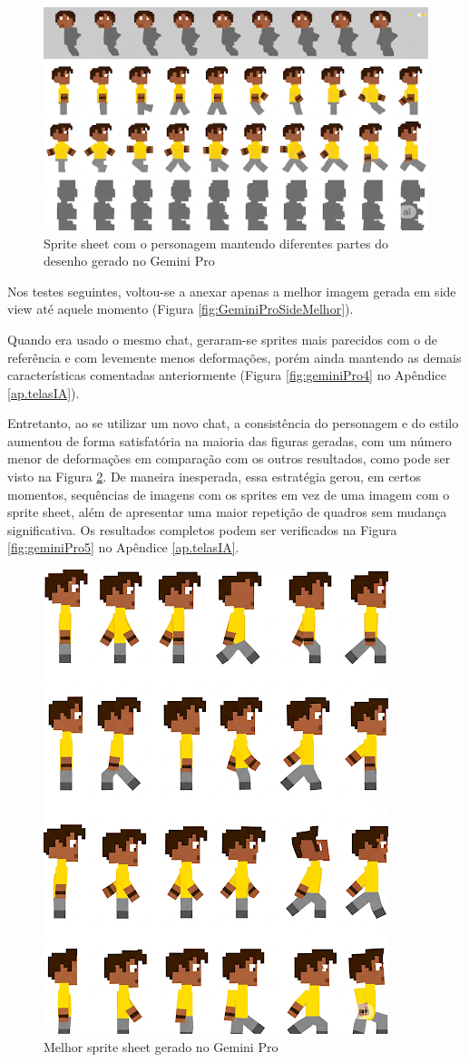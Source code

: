 \begin{figure}[htbp]
    \centering
    \caption{\small Sprite sheet com o personagem mantendo diferentes partes do desenho gerado no Gemini Pro}
    \label{fig:GeminiProSpriteSheetDesconstruido}
    \includegraphics[width=0.6\linewidth]{figs/geminiPro/chat9/1res5.PNG}
\end{figure}

Nos testes seguintes, voltou-se a anexar apenas a melhor imagem gerada em side view até aquele momento (Figura \ref{fig:GeminiProSideMelhor}). 

Quando era usado o mesmo chat, geraram-se sprites mais parecidos com o de referência e com levemente menos deformações, porém ainda mantendo as demais características comentadas anteriormente (Figura \ref{fig:geminiPro4} no Apêndice \ref{ap.telasIA}). 

Entretanto, ao se utilizar um novo chat, a consistência do personagem e do estilo aumentou de forma satisfatória na maioria das figuras geradas, com um número menor de deformações em comparação com os outros resultados, como pode ser visto na Figura \ref{fig:GeminiProSpriteSheetMelhor}. De maneira inesperada, essa estratégia gerou, em certos momentos, sequências de imagens com os sprites em vez de uma imagem com o sprite sheet, além de apresentar uma maior repetição de quadros sem mudança significativa.  Os resultados completos podem ser verificados na Figura \ref{fig:geminiPro5} no Apêndice \ref{ap.telasIA}.

\begin{figure}[htbp]
    \centering
    \caption{\small Melhor sprite sheet gerado no Gemini Pro}
    \label{fig:GeminiProSpriteSheetMelhor}
    \includegraphics[width=0.5\linewidth]{figs/geminiPro/chat10/tela1_res3.PNG}
\end{figure}

